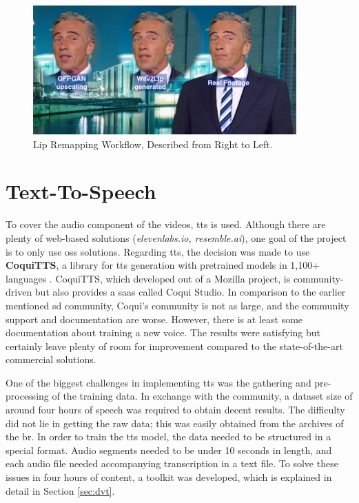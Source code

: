 \documentclass[
  a4paper,  %
  twoside,  %
  bibliography=totoc,
  headsepline,
  cleardoublepage=empty,
  parskip=half,
  draft=false
]{scrbook}
\begin{document}
\begin{figure}[h]
  \centering
  \includegraphics[width=0.9\textwidth]{./graphics/wav2lip/wav2lip-demo.png}
  \caption{Lip Remapping Workflow, Described from Right to Left.}
  \label{fig:wav2lip-demo}
\end{figure}

\section{Text-To-Speech}
\label{sec:tts}
To cover the audio component of the videos, \gls{tts} is used. Although there are plenty of web-based solutions (\textit{elevenlabs.io, resemble.ai}), one goal of the project is to only use \gls{oss} solutions. Regarding \gls*{tts}, the decision was made to use \textbf{CoquiTTS}, a library for \gls{tts} generation with pretrained models in 1,100+ languages \cite{erenCoquiTTS2021}. CoquiTTS, which developed out of a Mozilla project, is community-driven but also provides a \gls{saas} called Coqui Studio. In comparison to the earlier mentioned \gls{sd} community, Coqui's community is not as large, and the community support and documentation are worse. However, there is at least some documentation about training a new voice. The results were satisfying but certainly leave plenty of room for improvement compared to the state-of-the-art commercial solutions.

One of the biggest challenges in implementing \gls{tts} was the gathering and pre-processing of the training data. In exchange with the community, a dataset size of around four hours of speech was required to obtain decent results. The difficulty did not lie in getting the raw data; this was easily obtained from the archives of the \gls{br}. In order to train the \gls{tts} model, the data needed to be structured in a special format. Audio segments needed to be under 10 seconds in length, and each audio file needed accompanying transcription in a text file. To solve these issues in four hours of content, a toolkit was developed, which is explained in detail in Section \ref{sec:dvt}.
\end{document}
